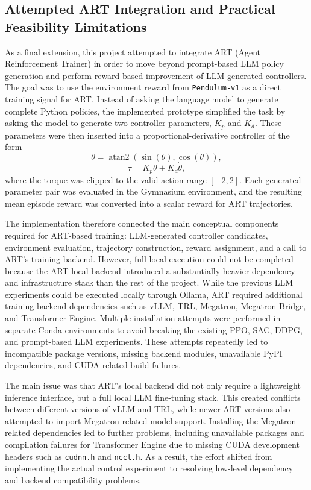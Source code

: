 \documentclass[11pt,a4paper]{article}
\begin{document}
\subsection{Attempted ART Integration and Practical Feasibility Limitations}

As a final extension, this project attempted to integrate ART (Agent Reinforcement Trainer) in order to move beyond prompt-based LLM policy generation and perform reward-based improvement of LLM-generated controllers. The goal was to use the environment reward from \texttt{Pendulum-v1} as a direct training signal for ART. Instead of asking the language model to generate complete Python policies, the implemented prototype simplified the task by asking the model to generate two controller parameters, $K_p$ and $K_d$. These parameters were then inserted into a proportional-derivative controller of the form
\[
\theta = \operatorname{atan2}(\sin(\theta), \cos(\theta)),
\]
\[
\tau = K_p \theta + K_d \dot{\theta},
\]
where the torque was clipped to the valid action range $[-2, 2]$. Each generated parameter pair was evaluated in the Gymnasium environment, and the resulting mean episode reward was converted into a scalar reward for ART trajectories.

The implementation therefore connected the main conceptual components required for ART-based training: LLM-generated controller candidates, environment evaluation, trajectory construction, reward assignment, and a call to ART's training backend. However, full local execution could not be completed because the ART local backend introduced a substantially heavier dependency and infrastructure stack than the rest of the project. While the previous LLM experiments could be executed locally through Ollama, ART required additional training-backend dependencies such as vLLM, TRL, Megatron, Megatron Bridge, and Transformer Engine. Multiple installation attempts were performed in separate Conda environments to avoid breaking the existing PPO, SAC, DDPG, and prompt-based LLM experiments. These attempts repeatedly led to incompatible package versions, missing backend modules, unavailable PyPI dependencies, and CUDA-related build failures.

The main issue was that ART's local backend did not only require a lightweight inference interface, but a full local LLM fine-tuning stack. This created conflicts between different versions of vLLM and TRL, while newer ART versions also attempted to import Megatron-related model support. Installing the Megatron-related dependencies led to further problems, including unavailable packages and compilation failures for Transformer Engine due to missing CUDA development headers such as \texttt{cudnn.h} and \texttt{nccl.h}. As a result, the effort shifted from implementing the actual control experiment to resolving low-level dependency and backend compatibility problems.
\end{document}
